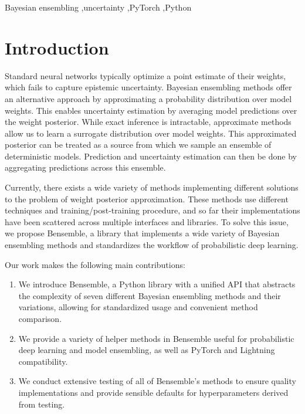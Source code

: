 \documentclass[a4paper,fleqn]{cas-dc}
\begin{document}

\begin{keywords}
Bayesian ensembling \sep uncertainty \sep PyTorch \sep Python
\end{keywords}

\maketitle


\section{Introduction}
Standard neural networks typically optimize a point estimate of their weights, which fails to capture epistemic uncertainty. Bayesian ensembling methods offer an alternative approach by approximating a probability distribution over model weights. This enables uncertainty estimation by averaging model predictions over the weight posterior. While exact inference is intractable, approximate methods allow us to learn a surrogate distribution over model weights. This approximated posterior can be treated as a source from which we sample an ensemble of deterministic models. Prediction and uncertainty estimation can then be done by aggregating predictions across this ensemble.  

Currently, there exists a wide variety of methods implementing different solutions to the problem of weight posterior approximation. These methods use different techniques and training/post-training procedure, and so far their implementations have been scattered across multiple interfaces and libraries. To solve this issue, we propose Bensemble, a library that implements a wide variety of Bayesian ensembling methods and standardizes the workflow of probabilistic deep learning.

Our work makes the following main contributions:
\begin{enumerate}
    \item We introduce Bensemble, a Python library with a unified API that abstracts the complexity of seven different Bayesian ensembling methods and their variations, allowing for standardized usage and convenient method comparison.
    \item We provide a variety of helper methods in Bensemble useful for probabilistic deep learning and model ensembling, as well as PyTorch and Lightning compatibility.
    \item We conduct extensive testing of all of Bensemble's methods to ensure quality implementations and provide sensible defaults for hyperparameters derived from testing.
\end{enumerate}
\end{document}
